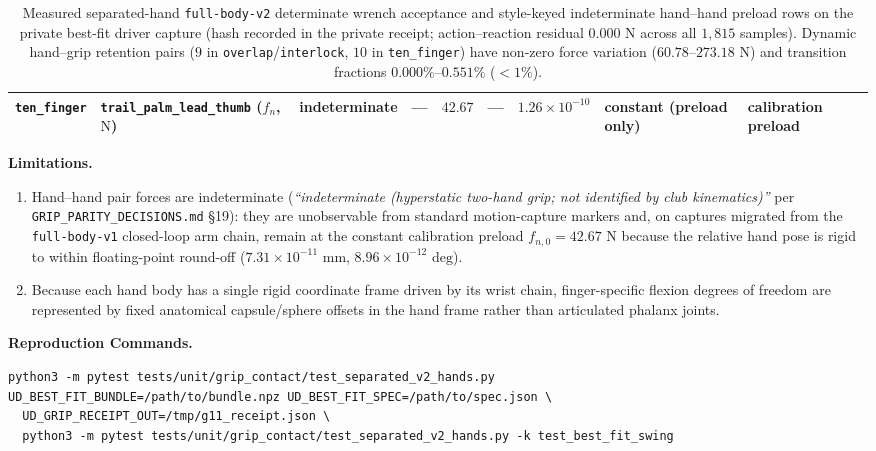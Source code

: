 \documentclass[11pt,a4paper]{article}
\begin{document}
\begin{table}[htbp]
\begin{tabular}{lllrrrrll}
\texttt{ten\_finger} & \texttt{trail\_palm\_lead\_thumb} ($f_n$, $\text{N}$) & indeterminate & --- & $42.67$ & --- & $1.26 \times 10^{-10}$ & constant (preload only) & calibration preload \\
\bottomrule
\end{tabular}
\caption{Measured separated-hand \texttt{full-body-v2} determinate wrench acceptance and style-keyed indeterminate hand--hand preload rows on the private best-fit driver capture (hash recorded in the private receipt; action--reaction residual $0.000\text{ N}$ across all $1{,}815$ samples). Dynamic hand--grip retention pairs ($9$ in \texttt{overlap}/\texttt{interlock}, $10$ in \texttt{ten\_finger}) have non-zero force variation ($60.78$--$273.18\text{ N}$) and transition fractions $0.000\%$--$0.551\%$ ($< 1\%$).}
\label{tab:g11_separated_v2_acceptance}
\end{table}

\textbf{Limitations.}
\begin{enumerate}[leftmargin=*,noitemsep]
\item Hand--hand pair forces are indeterminate (\emph{``indeterminate (hyperstatic two-hand grip; not identified by club kinematics)''} per \texttt{GRIP\_PARITY\_DECISIONS.md} \S 19): they are unobservable from standard motion-capture markers and, on captures migrated from the \texttt{full-body-v1} closed-loop arm chain, remain at the constant calibration preload $f_{n,0} = 42.67\text{ N}$ because the relative hand pose is rigid to within floating-point round-off ($7.31 \times 10^{-11}\text{ mm}$, $8.96 \times 10^{-12}\text{ deg}$).
\item Because each hand body has a single rigid coordinate frame driven by its wrist chain, finger-specific flexion degrees of freedom are represented by fixed anatomical capsule/sphere offsets in the hand frame rather than articulated phalanx joints.
\end{enumerate}

\textbf{Reproduction Commands.}
\begin{verbatim}
python3 -m pytest tests/unit/grip_contact/test_separated_v2_hands.py
UD_BEST_FIT_BUNDLE=/path/to/bundle.npz UD_BEST_FIT_SPEC=/path/to/spec.json \
  UD_GRIP_RECEIPT_OUT=/tmp/g11_receipt.json \
  python3 -m pytest tests/unit/grip_contact/test_separated_v2_hands.py -k test_best_fit_swing
\end{verbatim}
\end{document}
